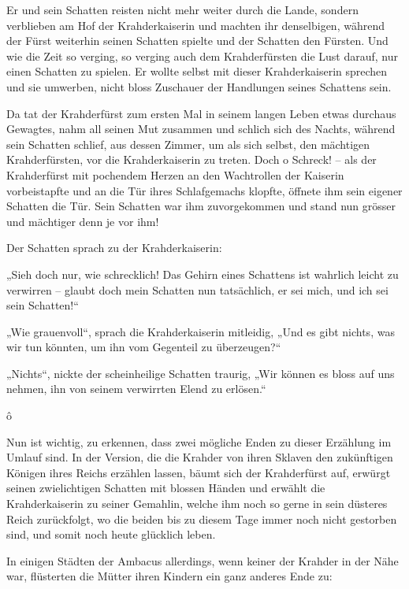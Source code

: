 \documentclass[10pt, a4paper, oneside]{book}
\newcommand{\trennzeichen}{%
    \begin{center}%
        \vspace*{-1em}
        \andorfont\Huge{ô}
    \end{center}
}
\begin{document}
Er und sein Schatten reisten nicht mehr weiter durch die Lande, sondern verblieben am Hof der Krahderkaiserin und machten ihr denselbigen, während der Fürst weiterhin seinen Schatten spielte und der Schatten den Fürsten. Und wie die Zeit so verging, so verging auch dem Krahderfürsten die Lust darauf, nur einen Schatten zu spielen. Er wollte selbst mit dieser Krahderkaiserin sprechen und sie umwerben, nicht bloss Zuschauer der Handlungen seines Schattens sein.

Da tat der Krahderfürst zum ersten Mal in seinem langen Leben etwas durchaus Gewagtes, nahm all seinen Mut zusammen und schlich sich des Nachts, während sein Schatten schlief, aus dessen Zimmer, um als sich selbst, den mächtigen Krahderfürsten, vor die Krahderkaiserin zu treten. Doch o Schreck! – als der Krahderfürst mit pochendem Herzen an den Wachtrollen der Kaiserin vorbeistapfte und an die Tür ihres Schlafgemachs klopfte, öffnete ihm sein eigener Schatten die Tür. Sein Schatten war ihm zuvorgekommen und stand nun grösser und mächtiger denn je vor ihm!

Der Schatten sprach zu der Krahderkaiserin:

„Sieh doch nur, wie schrecklich! Das Gehirn eines Schattens ist wahrlich leicht zu verwirren – glaubt doch mein Schatten nun tatsächlich, er sei mich, und ich sei sein Schatten!“

„Wie grauenvoll“, sprach die Krahderkaiserin mitleidig, „Und es gibt nichts, was wir tun könnten, um ihn vom Gegenteil zu überzeugen?“

„Nichts“, nickte der scheinheilige Schatten traurig, „Wir können es bloss auf uns nehmen, ihn von seinem verwirrten Elend zu erlösen.“



\trennzeichen



Nun ist wichtig, zu erkennen, dass zwei mögliche Enden zu dieser Erzählung im Umlauf sind. In der Version, die die Krahder von ihren Sklaven den zukünftigen Königen ihres Reichs erzählen lassen, bäumt sich der Krahderfürst auf, erwürgt seinen zwielichtigen Schatten mit blossen Händen und erwählt die Krahderkaiserin zu seiner Gemahlin, welche ihm noch so gerne in sein düsteres Reich zurückfolgt, wo die beiden bis zu diesem Tage immer noch nicht gestorben sind, und somit noch heute glücklich leben.

In einigen Städten der Ambacus allerdings, wenn keiner der Krahder in der Nähe war, flüsterten die Mütter ihren Kindern ein ganz anderes Ende zu:
\end{document}
